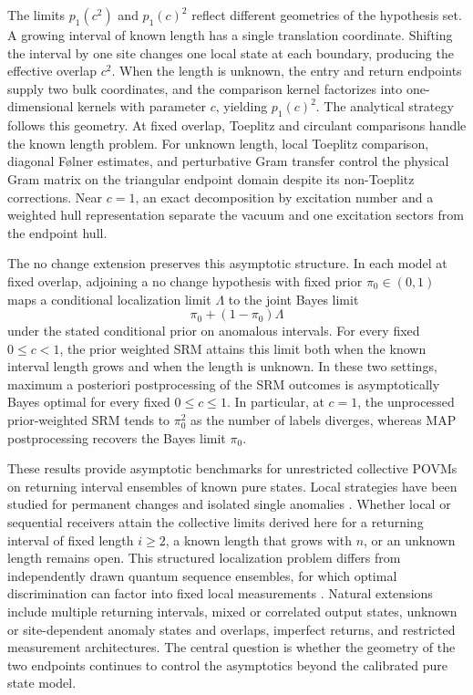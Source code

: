 The limits \(p_1(c^2)\) and \(p_1(c)^2\) reflect different geometries of the
hypothesis set. A growing interval of known length has a single translation
coordinate. Shifting the interval by one site changes one local state at each
boundary, producing the effective overlap \(c^2\). When the length is
unknown, the entry and return endpoints supply two bulk coordinates, and the
comparison kernel factorizes into one-dimensional kernels with parameter
\(c\), yielding \(p_1(c)^2\). The analytical strategy follows this geometry.
At fixed overlap, Toeplitz and circulant comparisons handle the known length
problem. For unknown length, local Toeplitz comparison, diagonal F{\o}lner
estimates, and perturbative Gram transfer control the physical Gram matrix on
the triangular endpoint domain despite its non-Toeplitz corrections. Near
\(c=1\), an exact decomposition by excitation number and a weighted hull
representation separate the vacuum and one excitation sectors from the
endpoint hull.

The no change extension preserves this asymptotic structure. In each model at
fixed overlap, adjoining a no change hypothesis with fixed prior
\(\pi_0\in(0,1)\) maps a conditional localization limit \(\Lambda\) to the
joint Bayes limit
\[
\pi_0+(1-\pi_0)\Lambda
\]
under the stated conditional prior on anomalous intervals. For every fixed
\(0\leq c<1\), the prior weighted SRM attains this limit both when the known
interval length grows and when the length is unknown. In these two settings,
maximum a posteriori postprocessing of the SRM outcomes is asymptotically
Bayes optimal for every fixed \(0\leq c\leq1\). In particular, at \(c=1\),
the unprocessed prior-weighted SRM tends to \(\pi_0^2\) as the number of
labels diverges, whereas MAP postprocessing recovers the Bayes limit
\(\pi_0\).

These results provide asymptotic benchmarks for unrestricted collective POVMs
on returning interval ensembles of known pure states. Local strategies have
been studied for permanent changes and isolated single anomalies
\cite{sentis2016,skotiniotis2024}. Whether local or sequential receivers
attain the collective limits derived here for a returning interval of fixed
length \(i\geq2\), a known length that grows with \(n\), or an unknown length
remains open. This structured localization problem differs from independently
drawn quantum sequence ensembles, for which optimal discrimination can factor
into fixed local measurements \cite{gupta2024sequence}. Natural extensions
include multiple returning intervals, mixed or correlated output states,
unknown or site-dependent anomaly states and overlaps, imperfect returns, and
restricted measurement architectures. The central question is whether the
geometry of the two endpoints continues to control the asymptotics beyond the
calibrated pure state model.




